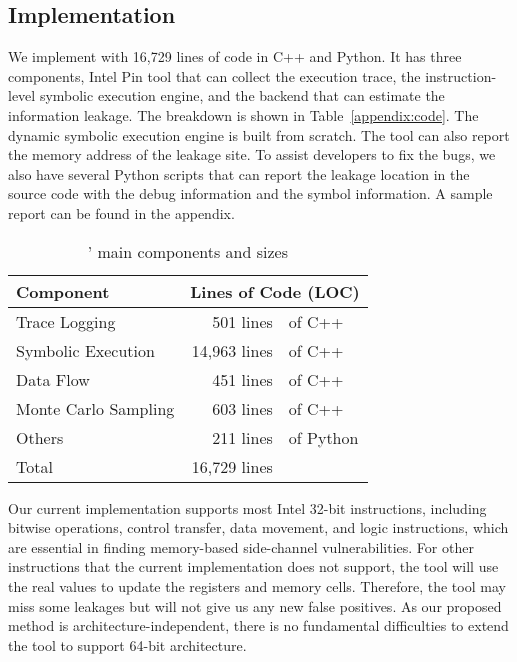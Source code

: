 \subsection{Implementation}
We implement \tool{} with 16,729 lines of code in C++ and Python. It has three
components, Intel Pin tool that can collect the execution trace, the
instruction-level symbolic execution engine, and the backend that can estimate
the information leakage. The breakdown is shown in
Table~\ref{appendix:code}. The dynamic symbolic execution engine is built from scratch.
The tool can also report the memory address of
the leakage site. To assist developers to fix the bugs, we also have several
Python scripts that can report the leakage location in the source code with the
debug information and the symbol information. A sample report can be found in
the appendix.

\label{appendix:code}
\begin{table}[h!]
    \centering
    \caption{\tool{}' main components and sizes}\label{tbl:implementation}
    \begin{tabular}{lr@{~}@{}l}
        \hline
        Component            & \multicolumn{2}{c}{Lines of Code (LOC)}             \\ \hline
        Trace Logging        & 501 lines                               & of C++    \\
        Symbolic Execution   & 14,963 lines                            & of C++    \\
        Data Flow            & 451 lines                               & of C++    \\
        Monte Carlo Sampling & 603 lines                               & of C++    \\
        Others               & 211 lines                               & of Python \\ \hline
        Total                & 16,729 lines                            &           \\\hline
    \end{tabular}
\end{table}

Our current implementation supports most Intel 32-bit instructions,
including bitwise operations, control transfer, data movement, and logic
instructions, which are essential in finding memory-based side-channel
vulnerabilities. For other instructions that the current implementation does not
support, the tool will use the real values to update the registers and memory
cells. Therefore, the tool may miss some leakages but will not give us any new
false positives. As our proposed method is architecture-independent,
there is no fundamental difficulties to extend the tool to support 64-bit
architecture. 

